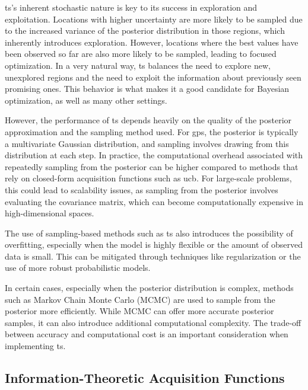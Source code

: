 \ac{ts}’s inherent stochastic nature is key to its success in exploration and exploitation. Locations with higher uncertainty are more likely to be sampled due to the increased variance of the posterior distribution in those regions, which inherently introduces exploration. However, locations where the best values have been observed so far are also more likely to be sampled, leading to focused optimization. In a very natural way, \ac{ts} balances the need to explore new, unexplored regions and the need to exploit the information about previously seen promising ones. This behavior is what makes it a good candidate for Bayesian optimization, as well as many other settings.

However, the performance of \ac{ts} depends heavily on the quality of the posterior approximation and the sampling method used. For \acp{gp}, the posterior is typically a multivariate Gaussian distribution, and sampling involves drawing from this distribution at each step. In practice, the computational overhead associated with repeatedly sampling from the posterior can be higher compared to methods that rely on closed-form acquisition functions such as \ac{ucb}. For large-scale problems, this could lead to scalability issues, as sampling from the posterior involves evaluating the covariance matrix, which can become computationally expensive in high-dimensional spaces. 

The use of sampling-based methods such as \ac{ts} also introduces the possibility of overfitting, especially when the model is highly flexible or the amount of observed data is small. This can be mitigated through techniques like regularization or the use of more robust probabilistic models.

In certain cases, especially when the posterior distribution is complex, methods such as Markov Chain Monte Carlo (MCMC) are used to sample from the posterior more efficiently. While MCMC can offer more accurate posterior samples, it can also introduce additional computational complexity. The trade-off between accuracy and computational cost is an important consideration when implementing \acf{ts}.

\subsection{Information-Theoretic Acquisition Functions}
\label{section:information_theoretic_acquisition_functions}


